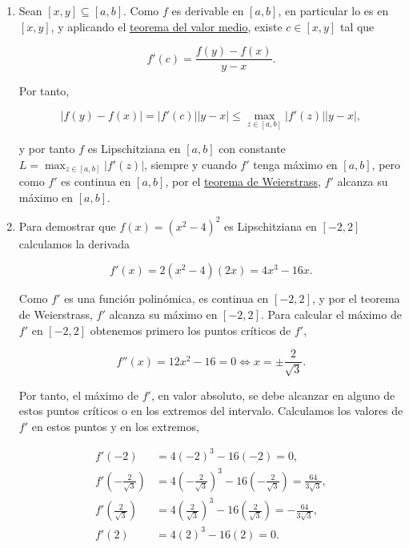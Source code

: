 \documentclass[
  a4paper,
]{scrreport}
\theoremstyle{definition}
\theoremstyle{remark}
\begin{document}
\begin{tcolorbox}[enhanced jigsaw, opacityback=0, bottomtitle=1mm, coltitle=black, opacitybacktitle=0.6, colback=white, breakable, left=2mm, titlerule=0mm, bottomrule=.15mm, colbacktitle=quarto-callout-tip-color!10!white, toprule=.15mm, leftrule=.75mm, arc=.35mm, toptitle=1mm, colframe=quarto-callout-tip-color-frame, title=\textcolor{quarto-callout-tip-color}{\faLightbulb}\hspace{0.5em}{Solución}, rightrule=.15mm]

\begin{enumerate}
\def\labelenumi{\alph{enumi}.}
\item
  Sean \([x,y]\subseteq [a,b]\). Como \(f\) es derivable en \([a,b]\),
  en particular lo es en \([x,y]\), y aplicando el
  \href{https://aprendeconalf.es/analisis-manual/07-derivadas.html\#thm-valor-medio}{teorema
  del valor medio}, existe \(c\in[x,y]\) tal que

  \[
  f'(c) = \frac{f(y)-f(x)}{y-x}.
  \]

  Por tanto,

  \[
  |f(y)-f(x)| = |f'(c)||y-x| \leq \max_{z\in [a,b]}|f'(z)||y-x|,
  \]

  y por tanto \(f\) es Lipschitziana en \([a,b]\) con constante
  \(L=\max_{z\in [a,b]}|f'(z)|\), siempre y cuando \(f'\) tenga máximo
  en \([a,b]\), pero como \(f'\) es continua en \([a,b]\), por el
  \href{https://aprendeconalf.es/analisis-manual/06-limites.html\#thm-weierstrass}{teorema
  de Weierstrass}, \(f'\) alcanza su máximo en \([a,b]\).
\item
  Para demostrar que \(f(x) = (x^2-4)^2\) es Lipschitziana en \([-2,2]\)
  calculamos la derivada

  \[
  f'(x) = 2(x^2-4)(2x) = 4x^3-16x.
  \]

  Como \(f'\) es una función polinómica, es continua en \([-2,2]\), y
  por el teorema de Weierstrass, \(f'\) alcanza su máximo en \([-2,2]\).
  Para calcular el máximo de \(f'\) en \([-2,2]\) obtenemos primero los
  puntos críticos de \(f'\),

  \[
  f''(x) = 12x^2-16 = 0 \Leftrightarrow x = \pm\frac{2}{\sqrt{3}}.
  \]

  Por tanto, el máximo de \(f'\), en valor absoluto, se debe alcanzar en
  alguno de estos puntos críticos o en los extremos del intervalo.
  Calculamos los valores de \(f'\) en estos puntos y en los extremos,

  \begin{align*}
  f'(-2) &= 4(-2)^3-16(-2) = 0,\\
  f'\left(-\frac{2}{\sqrt{3}}\right) &= 4\left(-\frac{2}{\sqrt{3}}\right)^3-16\left(-\frac{2}{\sqrt{3}}\right) = \frac{64}{3\sqrt{3}},\\
  f'\left(\frac{2}{\sqrt{3}}\right) &= 4\left(\frac{2}{\sqrt{3}}\right)^3-16\left(\frac{2}{\sqrt{3}}\right) = -\frac{64}{3\sqrt{3}},\\
  f'(2) &= 4(2)^3-16(2) = 0.
  \end{align*}


\end{enumerate}
\end{tcolorbox}
\end{document}
